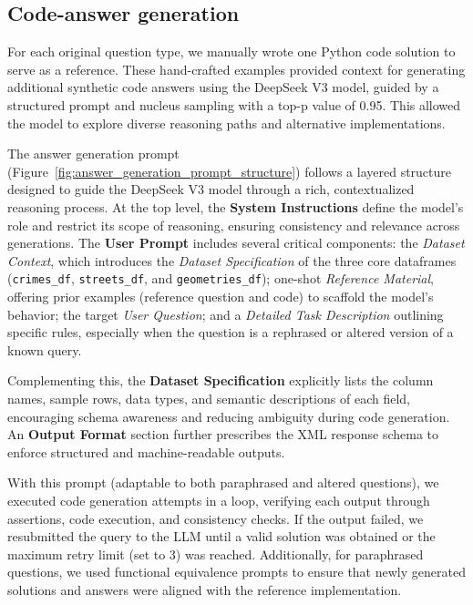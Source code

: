 \subsection{Code-answer generation}

For each original question type, we manually wrote one Python code solution to serve as a reference. These hand-crafted examples provided context for generating additional synthetic code answers using the DeepSeek V3 model, guided by a structured prompt and nucleus sampling \citep{Holtzman2020NucleusSampling, Ahmad2025OCRNVidia, Nvidia2024KaggleMath} with a top-p value of 0.95. This allowed the model to explore diverse reasoning paths and alternative implementations.

The answer generation prompt (Figure~\ref{fig:answer_generation_prompt_structure}) follows a layered structure designed to guide the DeepSeek V3 model through a rich, contextualized reasoning process. At the top level, the \textbf{System Instructions} define the model’s role and restrict its scope of reasoning, ensuring consistency and relevance across generations. The \textbf{User Prompt} includes several critical components: the \textit{Dataset Context}, which introduces the \textit{Dataset Specification} of the three core dataframes (\texttt{crimes\_df}, \texttt{streets\_df}, and \texttt{geometries\_df}); one-shot \textit{Reference Material}, offering prior examples (reference question and code) to scaffold the model’s behavior; the target \textit{User Question}; and a \textit{Detailed Task Description} outlining specific rules, especially when the question is a rephrased or altered version of a known query.

Complementing this, the \textbf{Dataset Specification} explicitly lists the column names, sample rows, data types, and semantic descriptions of each field, encouraging schema awareness and reducing ambiguity during code generation. An \textbf{Output Format} section further prescribes the XML response schema to enforce structured and machine-readable outputs.

With this prompt (adaptable to both paraphrased and altered questions), we executed code generation attempts in a loop, verifying each output through assertions, code execution, and consistency checks. If the output failed, we resubmitted the query to the LLM until a valid solution was obtained or the maximum retry limit (set to 3) was reached. Additionally, for paraphrased questions, we used functional equivalence prompts to ensure that newly generated solutions and answers were aligned with the reference implementation.

